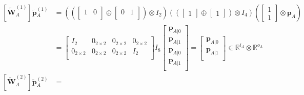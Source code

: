 \documentclass[10pt, a4paper]{article}
\numberwithin{equation}{section} %
\theoremstyle{definition}
\theoremstyle{plain}
\newcommand{\?}{\mathrel{?}} %
\newcommand{\R}{\mathbb{R}} %
\newcommand{\cvec}[1]{\boldsymbol{\mathbf{#1}}}    %
\newcommand{\matr}[2][]{\left[\mathbf{#2}#1\right]} %
\begin{document}
                \begin{align}
                  \matr[_A^{(1)}]{\tilde{W}} \cvec{\tilde{p}}{_A^{(1)}} &= \left( \left(
                      \begin{bmatrix} 1 & 0 \\ \end{bmatrix} 
                  \oplus \begin{bmatrix} 0 & 1 \\ \end{bmatrix} \right) \otimes I_2 \right)
                  \left( \left( \begin{bmatrix} 1 \end{bmatrix} \oplus \begin{bmatrix} 1 \end{bmatrix} \right) \otimes I_{4} \right) 
                  \left( \begin{bmatrix} 1 \\ 1 \end{bmatrix} \otimes \cvec{p}_A \right) \\
                                           &= \begin{bmatrix}
                                             I_2 & 0_{2\times 2} & 0_{2\times 2} & 0_{2\times 2} \\
                                             0_{2\times 2} & 0_{2\times 2} & 0_{2\times 2} & I_2 \\
                                             \end{bmatrix} I_{8} \begin{bmatrix}
                                             \cvec{p}_{A|0} \\
                                             \cvec{p}_{A|1} \\
                                             \cvec{p}_{A|0} \\
                                             \cvec{p}_{A|1} \\
                                             \end{bmatrix} = \begin{bmatrix}
                                             \cvec{p}_{A|0} \\
                                             \cvec{p}_{A|1} \\
                                           \end{bmatrix} \in \R^{i_A} \otimes \R^{o_A} \\
                  \matr[_A^{(2)}]{\tilde{W}} \cvec{\tilde{p}}{_A^{(2)}} &= \begin{gathered}

\end{gathered}
\end{align}
\end{document}
